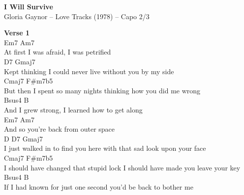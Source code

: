 \documentclass[a4paper]{article}
\begin{document}
    \begin{center}
        \textbf{I Will Survive}
        ~\\
        Gloria Gaynor -- Love Tracks (1978)
         -- Capo 2/3
    \end{center}
    {
        \scriptsize
        \textbf{Verse 1}
        ~\\
        {
            \cutive
            \obeyspaces
   Em7                       Am7
\\
At first I was afraid, I was petrified
\\
              D7                             Gmaj7
\\
Kept thinking I could never live without you by my side
\\
           Cmaj7                         F\#m7b5
\\
But then I spent so many nights thinking how you did me wrong
\\
           Bsus4             B
\\
And I grew strong, I learned how to get along
\\
              Em7             Am7
\\
And so you're back from outer space
\\
              D              D7                 Gmaj7
\\
I just walked in to find you here with that sad look upon your face
\\
              Cmaj7                                F\#m7b5
\\
I should have changed that stupid lock I should have made you leave your key
\\
         Bsus4                              B
\\
If I had known for just one second you'd be back to bother me
\\

}}
\end{document}
